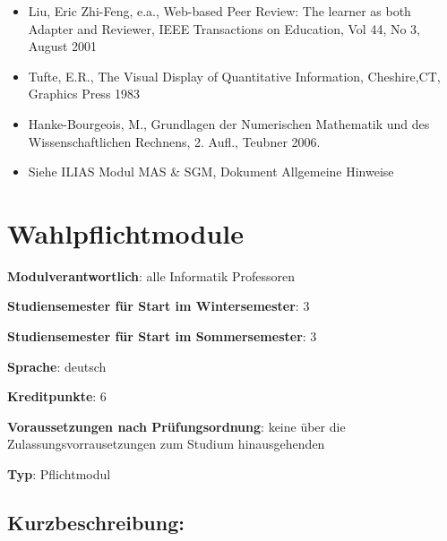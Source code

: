 \begin{itemize}
\tightlist
\item
  Liu, Eric Zhi-Feng, e.a., Web-based Peer Review: The learner as both
  Adapter and Reviewer, IEEE Transactions on Education, Vol 44, No 3,
  August 2001
\item
  Tufte, E.R., The Visual Display of Quantitative Information,
  Cheshire,CT, Graphics Press 1983
\item
  Hanke-Bourgeois, M., Grundlagen der Numerischen Mathematik und des
  Wissenschaftlichen Rechnens, 2. Aufl., Teubner 2006.
\item
  Siehe ILIAS Modul MAS \& SGM, Dokument Allgemeine Hinweise
\end{itemize}

\chapter{Wahlpflichtmodule\label{/mi-2017/modulbeschreibungen-master/MA_All_Modul_Wahlpflichtmodule}}\label{wahlpflichtmodulepathlabelmi-2017modulbeschreibungen-mastermaux5fallux5fmodulux5fwahlpflichtmodule}

\begin{modulHead}
\textbf{Modulverantwortlich}: alle Informatik
Professoren
\end{modulHead}
\begin{modulHead}
\textbf{Studiensemester
für Start im Wintersemester}:
3
\end{modulHead}
\begin{modulHead}
\textbf{Studiensemester für Start
im Sommersemester}:
3
\end{modulHead}
\begin{modulHead}
\textbf{Sprache}:
deutsch
\end{modulHead}
\begin{modulHead}
\textbf{Kreditpunkte}:
6
\end{modulHead}
\begin{modulHead}
\textbf{Voraussetzungen nach
Prüfungsordnung}: keine über die Zulassungsvorrausetzungen zum Studium
hinausgehenden
\end{modulHead}
\begin{modulHead}
\textbf{Typ}:
Pflichtmodul
\end{modulHead}


\section*{Kurzbeschreibung:\label{/mi-2017/modulbeschreibungen-master/MA_All_Modul_Wahlpflichtmodule}}\label{kurzbeschreibungpathlabelmi-2017modulbeschreibungen-mastermaux5fallux5fmodulux5fwahlpflichtmodule}

